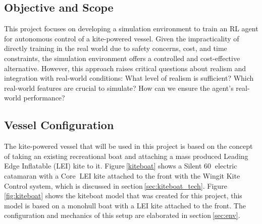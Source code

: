 \subsection{Objective and Scope}
This project focuses on developing a simulation environment to train an RL agent for autonomous control of a kite-powered vessel. Given the impracticality of directly training in the real world due to safety concerns, cost, and time constraints, the simulation environment offers a controlled and cost-effective alternative. However, this approach raises critical questions about realism and integration with real-world conditions: What level of realism is sufficient? Which real-world features are crucial to simulate? How can we ensure the agent's real-world performance?

\subsection{Vessel Configuration}

The kite-powered vessel that will be used in this project is based on the concept of taking an existing recreational boat and attaching a mass produced Leading Edge Inflatable (LEI) kite to it. Figure$~$\ref{kiteboat} shows a Silent 60$~$\cite{silent} electric catamaran with a Core$~$\cite{core} LEI kite attached to the front with the Wingit Kite Control system, which is discussed in section$~$\ref{sec:kiteboat_tech}. Figure$~$\ref{fig:kiteboat} shows the kiteboat model that was created for this project, this model is based on a monohull boat with a LEI kite attached to the front. The configuration and mechanics of this setup are elaborated in section$~$\ref{sec:env}. 

